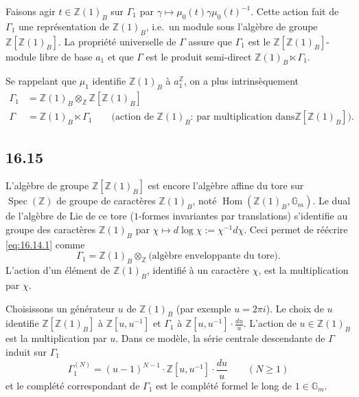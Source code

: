 \documentclass[12pt,a4paper]{article}
\theoremstyle{plain}
\theoremstyle{definition}
\theoremstyle{remark}
\DeclareMathOperator{\Spec}{Spec}
\DeclareMathOperator{\Hom}{Hom}
\newcommand{\Betti}{B}
\newcommand{\Gm}{\mathbb{G}_m}
\newcommand{\ZZ}{\mathbb{Z}}
\begin{document}
Faisons agir $t \in \ZZ(1)_\Betti$ sur $\Gamma_1$ par
$\gamma \mapsto \mu_0(t)\gamma\mu_0(t)^{-1}$. Cette action fait de $\Gamma_1$
une repr\'esentation de $\ZZ(1)_\Betti$, i.e.\ un module sous l'alg\`ebre de
groupe $\ZZ[\ZZ(1)_\Betti]$. La propri\'et\'e universelle de $\Gamma$ assure
que $\Gamma_1$ est le $\ZZ[\ZZ(1)_\Betti]$-module libre de base $a_1$ et que
$\Gamma$ est le produit semi-direct $\ZZ(1)_\Betti \ltimes \Gamma_1$.

Se rappelant que $\mu_1$ identifie $\ZZ(1)_\Betti$ \`a $a_1^\ZZ$, on a plus
intrins\`equement
\begin{align}
\Gamma_1 &= \ZZ(1)_\Betti \otimes_\ZZ \ZZ[\ZZ(1)_\Betti] \label{eq:16.14.1} \\
\Gamma &= \ZZ(1)_\Betti \ltimes \Gamma_1 \qquad
\text{(action de $\ZZ(1)_\Betti$: par multiplication dans
$\ZZ[\ZZ(1)_\Betti]$).} \label{eq:16.14.2}
\end{align}

\subsection*{16.15}

L'alg\`ebre de groupe $\ZZ[\ZZ(1)_\Betti]$ est encore l'alg\`ebre affine du
tore sur $\Spec(\ZZ)$ de groupe de caract\`eres $\ZZ(1)_\Betti$, not\'e
$\Hom(\ZZ(1)_\Betti, \Gm)$. Le dual de l'alg\`ebre de Lie de ce tore
($1$-formes invariantes par translations) s'identifie au groupe des
caract\`eres $\ZZ(1)_\Betti$ par
$\chi \mapsto d\log\chi := \chi^{-1}d\chi$. Ceci permet de r\'e\'ecrire
\eqref{eq:16.14.1} comme
\begin{equation}\label{eq:16.15.1}
\Gamma_1 = \ZZ(1)_\Betti \otimes_\ZZ \text{(alg\`ebre enveloppante du
tore).}
\end{equation}
L'action d'un \'el\'ement de $\ZZ(1)_\Betti$, identifi\'e \`a un caract\`ere
$\chi$, est la multiplication par $\chi$.

Choisissons un g\'en\'erateur $u$ de $\ZZ(1)_\Betti$ (par exemple
$u = 2\pi i$). Le choix de $u$ identifie $\ZZ[\ZZ(1)_\Betti]$ \`a
$\ZZ[u,u^{-1}]$ et $\Gamma_1$ \`a
$\ZZ[u,u^{-1}] \cdot \frac{du}{u}$. L'action de $u \in \ZZ(1)_\Betti$ est la
multiplication par $u$. Dans ce mod\`ele, la s\'erie centrale descendante
de $\Gamma$ induit sur $\Gamma_1$
\begin{equation}\label{eq:16.15.2}
\Gamma_1^{(N)} = (u-1)^{N-1} \cdot \ZZ[u,u^{-1}] \cdot \frac{du}{u}
\qquad (N \geq 1)
\end{equation}
et le compl\'et\'e correspondant de $\Gamma_1$ est le compl\'et\'e formel le
long de $1 \in \Gm$.
\end{document}

